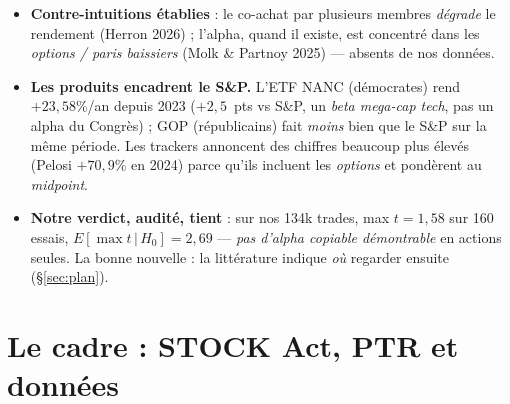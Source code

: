 \documentclass[11pt,a4paper]{article}
\begin{document}
\begin{itemize}
  \item \textbf{Contre-intuitions établies} : le co-achat par plusieurs membres \emph{dégrade} le rendement
  (Herron 2026) ; l'alpha, quand il existe, est concentré dans les \emph{options / paris baissiers}
  (Molk \& Partnoy 2025) --- absents de nos données.
  \item \textbf{Les produits encadrent le S\&P.} L'ETF NANC (démocrates) rend $+23{,}58\%$/an depuis 2023
  ($+2{,}5$~pts vs S\&P, un \emph{beta mega-cap tech}, pas un alpha du Congrès) ; GOP (républicains)
  fait \emph{moins} bien que le S\&P sur la même période. Les trackers annoncent des chiffres beaucoup plus
  élevés (Pelosi $+70{,}9\%$ en 2024) parce qu'ils incluent les \emph{options} et pondèrent au \emph{midpoint}.
  \item \textbf{Notre verdict, audité, tient} : sur nos 134k trades, max $t = 1{,}58$ sur 160 essais,
  $E[\max t \,|\, H_0] = 2{,}69$ --- \emph{pas d'alpha copiable démontrable} en actions seules. La bonne
  nouvelle : la littérature indique \emph{où} regarder ensuite (§\ref{sec:plan}).
\end{itemize}

\section{Le cadre : STOCK Act, PTR et données}
\end{document}
